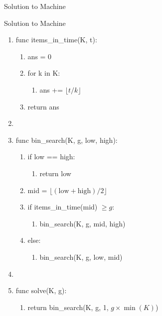 \documentclass[9pt]{beamer}
\newenvironment{pseudobox}[1]{\begin{exampleblock}{#1}\ttfamily\begin{enumerate}[label=\arabic*.,leftmargin=1.4em,itemsep=0pt]}{\end{enumerate}\end{exampleblock}}
\begin{document}
\begin{frame}[fragile]{Solution to Machine}
\begin{pseudobox}{Solution to Machine}
\item func items\_in\_time(K, t):
  \begin{enumerate}[label=\alph*.,leftmargin=1.4em,itemsep=0pt]
  \item ans = 0
  \item for k in K:
    \begin{enumerate}[label=\roman*.,leftmargin=1.4em,itemsep=0pt]
    \item ans += $\lfloor t/k \rfloor$
    \end{enumerate}
  \item return ans
  \end{enumerate}
\item {}
\item func bin\_search(K, g, low, high):
  \begin{enumerate}[label=\alph*.,leftmargin=1.4em,itemsep=0pt]
  \item if low == high:
    \begin{enumerate}[label=\roman*.,leftmargin=1.4em,itemsep=0pt]
    \item return low
    \end{enumerate}
  \item mid = $\lfloor (\text{low}+\text{high})/2 \rfloor$
  \item if items\_in\_time(mid) $\geq g$:
    \begin{enumerate}[label=\roman*.,leftmargin=1.4em,itemsep=0pt]
    \item bin\_search(K, g, mid, high)
    \end{enumerate}
  \item else:
    \begin{enumerate}[label=\roman*.,leftmargin=1.4em,itemsep=0pt]
    \item bin\_search(K, g, low, mid)
    \end{enumerate}
  \end{enumerate}
\item {}
\item func solve(K, g):
  \begin{enumerate}[label=\alph*.,leftmargin=1.4em,itemsep=0pt]
  \item return bin\_search(K, g, 1, $g \times \min(K)$)
  \end{enumerate}
\end{pseudobox}
\end{frame}
\end{document}
